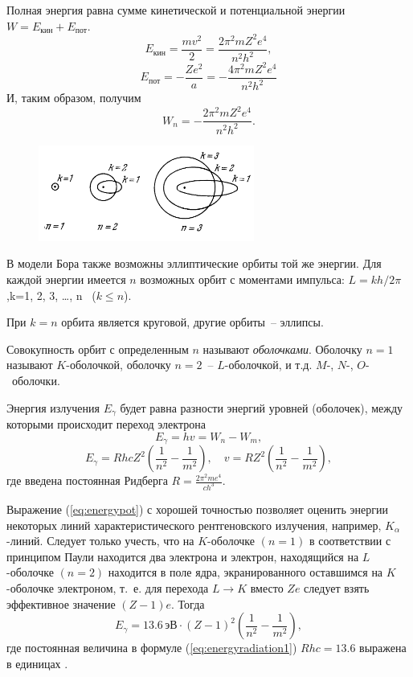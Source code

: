 \documentclass[a4paper,14pt, openany, twoside, draft]{extbook} %
\begin{document}
Полная энергия равна сумме кинетической и потенциальной энергии $W=E_{\text{кин}}+E_{\text{пот}}$.
\begin{equation}
\label{eq:energykinet}
E_{\text{кин}}=\frac{mv^2}{2}=\frac{2\pi^2mZ^2e^4}{n^2h^2},
\end{equation}
\begin{equation}
\label{eq:energypot}
E_{\text{пот}}=-\frac{Ze^2}{a}=-\frac{4\pi^2mZ^2e^4}{n^2h^2}
\end{equation}
И, таким образом, получим
\begin{equation}
\label{eq:fullenergy}
W_n=-\frac{2\pi^2mZ^2e^4}{n^2h^2}.
\end{equation}

\begin{figure}
\centering
\includegraphics[width=7.091cm,height=3.157cm]{a21-img001.png}
\end{figure}
В модели Бора также возможны эллиптические орбиты той же энергии.  Для каждой энергии имеется $n$ возможных орбит с моментами импульса:
$L=kh/2\pi$,\quad k=1, 2, 3, …, n~ ($k\leq n$).

При $k=n$ орбита является круговой, другие орбиты~-- эллипсы.

Совокупность орбит с определенным $n$ называют \emph{оболочками}.  Оболочку $n=1$ называют $K$-оболочкой, оболочку $n=2$~-- $L$-оболочкой, и т.д.  $M$-, $N$-, $O$-~оболочки.

Энергия излучения  $E_{\gamma }$ будет равна разности энергий уровней (оболочек), между которыми происходит переход электрона
\begin{equation}
\label{eq:energyradiation}
E_{\gamma }=hv=W_n-W_m,
\end{equation}
\begin{equation}
\label{eq:energyradiation1}
E_{\gamma }=RhcZ^2(\frac {1}{n^2}-\frac {1}{m^2}),\quad v=RZ^2(\frac {1}{n^2}-\frac {1}{m^2}),
\end{equation}
где введена постоянная Ридберга $R=\frac{2\pi^2me^4}{ch^3}$.

Выражение (\ref{eq:energypot}) с хорошей точностью позволяет оценить энергии некоторых линий характеристического рентгеновского излучения, например, $K_{\alpha}$-линий.  Следует только учесть, что на $K$-оболочке $(n=1)$ в соответствии с принципом Паули находится два электрона и электрон, находящийся на $L$-оболочке $(n=2)$ находится в поле ядра, экранированного оставшимся на $K$-оболочке электроном, т.~е. для перехода $L\rightarrow K$ вместо $Ze$ следует взять эффективное значение $(Z-1)e$.  Тогда
\begin{equation}
\label{eq:energyradiation2}
E_{\gamma }=13.6\,{\mathit{\text{эВ}}}\cdot(Z-1)^2(\frac{1}{n^2}-\frac{1}{m^2}),
\end{equation}
где постоянная величина в формуле (\ref{eq:energyradiation1}) $Rhc=13.6$ выражена в единицах .
\end{document}
